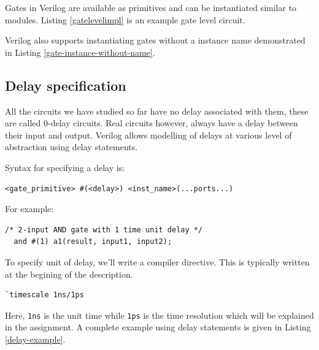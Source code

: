 \documentclass[a4paper,10pt]{article}
\theoremstyle{mytheor}
\newcommand{
  \insertverilog}[3]{
  
}
\newcommand{\inlinev}[1]{\lstinline[style=verilog-inline-style]{#1}}
\begin{document}
Gates in Verilog are available as primitives and can be instantiated
similar to modules. Listing \ref{gatelevelimpl} is an example gate
level circuit.

\insertverilog{./verilog_files/gateLevelExample.v}{gatelevelimpl}{\text{Example
    module using Gate-level modelling}}

Verilog also supports instantiating gates without a instance name
demonstrated in Listing \ref{gate-instance-without-name}.
\insertverilog{./verilog_files/unnamedGate.v}{gate-instance-without-name}{\text{Instantiating
    unnamed gates}}

\subsection{Delay specification}
All the circuits we have studied so far have no delay associated with
them, these are called 0-delay circuits. Real circuits however, always
have a delay between their input and output. Verilog allows modelling
of delays at various level of abstraction using delay statements.

Syntax for specifying a delay is:
\begin{lstlisting}[style=verilog-inline-style, xleftmargin=0.2\textwidth]
  <gate_primitive> #(<delay>) <inst_name>(...ports...) 
\end{lstlisting}

For example:
\begin{lstlisting}[style=verilog-inline-style, xleftmargin=0.25\textwidth]
  /* 2-input AND gate with 1 time unit delay */
  and #(1) a1(result, input1, input2);
\end{lstlisting}

\vspace{0.1cm} To specify unit of delay, we'll write a compiler
directive. This is typically written at the begining of the
description.

\begin{center}
  \begin{lstlisting}[style=verilog-inline-style,xleftmargin=.35\textwidth]
    `timescale 1ns/1ps
  \end{lstlisting}
\end{center}


Here, \inlinev{1ns} is the unit time while
\inlinev{1ps} is the time resolution which will be
explained in the assignment. A complete example using delay
statements is given in Listing \ref{delay-example}.

\insertverilog{./verilog_files/delayExample.v}{delay-example}{\text{Example
    usage of delays statement to specify propagation delay of logic
    gates.}}
\end{document}
